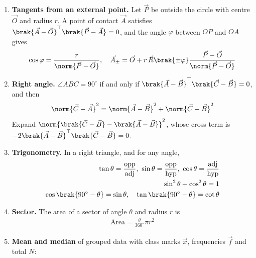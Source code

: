 \begin{enumerate}[label=\thesubsection.\arabic*, ref=\thesubsection.\theenumi, itemsep=0pt]
\begin{align}
\vec{R}\brak{\theta} = \myvec{\cos\theta & -\sin\theta \\ \sin\theta & \cos\theta}
\label{eq:EE26BTECH11225-rot}
\end{align}
The third vertex of an equilateral triangle on $UV$ is $\vec{U} + \vec{R}\brak{\pm 60^\circ}\brak{\vec{V}-\vec{U}}$.
\item \textbf{Tangents from an external point.} Let $\vec{P}$ be outside the circle with centre $\vec{O}$ and radius $r$. A point of contact $\vec{A}$ satisfies $\brak{\vec{A}-\vec{O}}^{\top}\brak{\vec{P}-\vec{A}} = 0$, and the angle $\varphi$ between $OP$ and $OA$ gives
\begin{align}
\cos\varphi = \frac{r}{\norm{\vec{P}-\vec{O}}}, \quad \vec{A}_{\pm} = \vec{O} + r\,\vec{R}\brak{\pm\varphi}\frac{\vec{P}-\vec{O}}{\norm{\vec{P}-\vec{O}}}
\label{eq:EE26BTECH11225-tangent}
\end{align}
\item \textbf{Right angle.} $\angle ABC = 90^\circ$ if and only if $\brak{\vec{A}-\vec{B}}^{\top}\brak{\vec{C}-\vec{B}} = 0$, and then
\begin{align}
\norm{\vec{C}-\vec{A}}^2 = \norm{\vec{A}-\vec{B}}^2 + \norm{\vec{C}-\vec{B}}^2
\label{eq:EE26BTECH11225-pythagoras}
\end{align}
\solution Expand $\norm{\brak{\vec{C}-\vec{B}} - \brak{\vec{A}-\vec{B}}}^2$, whose cross term is $-2\brak{\vec{A}-\vec{B}}^{\top}\brak{\vec{C}-\vec{B}} = 0$.
\item \textbf{Trigonometry.} In a right triangle, and for any angle,
\begin{align}
\tan\theta = \frac{\text{opp}}{\text{adj}}, \ \sin\theta = \frac{\text{opp}}{\text{hyp}}, \ \cos\theta = \frac{\text{adj}}{\text{hyp}}
\label{eq:EE26BTECH11225-trig-ratios} \\
\sin^2\theta + \cos^2\theta = 1
\label{eq:EE26BTECH11225-trig-1} \\
\cos\brak{90^\circ - \theta} = \sin\theta, \quad \tan\brak{90^\circ - \theta} = \cot\theta
\label{eq:EE26BTECH11225-complementary}
\end{align}
\item \textbf{Sector.} The area of a sector of angle $\theta$ and radius $r$ is
\begin{align}
\text{Area} = \frac{\theta}{360^\circ}\pi r^2
\label{eq:EE26BTECH11225-sector}
\end{align}
\item \textbf{Mean and median} of grouped data with class marks $\vec{x}$, frequencies $\vec{f}$ and total $N$:

\end{enumerate}
